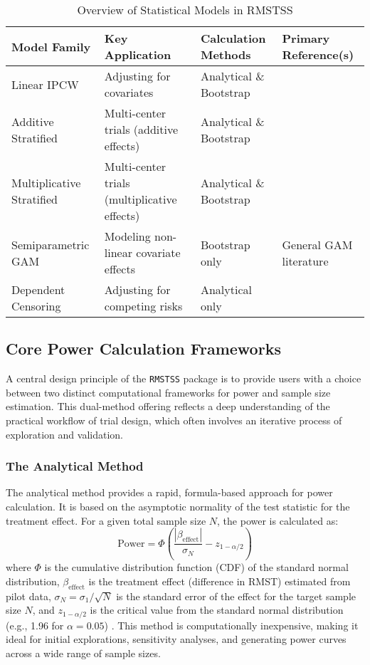 \documentclass[article]{jss}
\begin{document}
\begin{table}[h!]
\centering
\caption{Overview of Statistical Models in RMSTSS}
\label{tab:model_overview}
\begin{tabular}{@{}llll@{}}
\toprule
\textbf{Model Family} & \textbf{Key Application} & \textbf{Calculation Methods} & \textbf{Primary Reference(s)} \\ \midrule
Linear IPCW & Adjusting for covariates & Analytical \& Bootstrap & \citet{tian2014} \\
Additive Stratified & Multi-center trials (additive effects) & Analytical \& Bootstrap & \citet{zhang2024} \\
Multiplicative Stratified & Multi-center trials (multiplicative effects) & Analytical \& Bootstrap & \citet{wang2019} \\
Semiparametric GAM & Modeling non-linear covariate effects & Bootstrap only & General GAM literature \\
Dependent Censoring & Adjusting for competing risks & Analytical only & \citet{wang2018} \\ \bottomrule
\end{tabular}
\end{table}

\subsection{Core Power Calculation Frameworks}
A central design principle of the \texttt{RMSTSS} package is to provide users with a choice between two distinct computational frameworks for power and sample size estimation. This dual-method offering reflects a deep understanding of the practical workflow of trial design, which often involves an iterative process of exploration and validation.

\subsubsection{The Analytical Method}
The analytical method provides a rapid, formula-based approach for power calculation. It is based on the asymptotic normality of the test statistic for the treatment effect. For a given total sample size $N$, the power is calculated as:
\begin{equation}
\text{Power} = \Phi\left( \frac{|\beta_{\text{effect}}|}{\sigma_N} - z_{1-\alpha/2} \right)
\end{equation}
where $\Phi$ is the cumulative distribution function (CDF) of the standard normal distribution, $\beta_{\text{effect}}$ is the treatment effect (difference in RMST) estimated from pilot data, $\sigma_N = \sigma_1 / \sqrt{N}$ is the standard error of the effect for the target sample size $N$, and $z_{1-\alpha/2}$ is the critical value from the standard normal distribution (e.g., 1.96 for $\alpha=0.05$) \cite{[1]}. This method is computationally inexpensive, making it ideal for initial explorations, sensitivity analyses, and generating power curves across a wide range of sample sizes.
\end{document}
